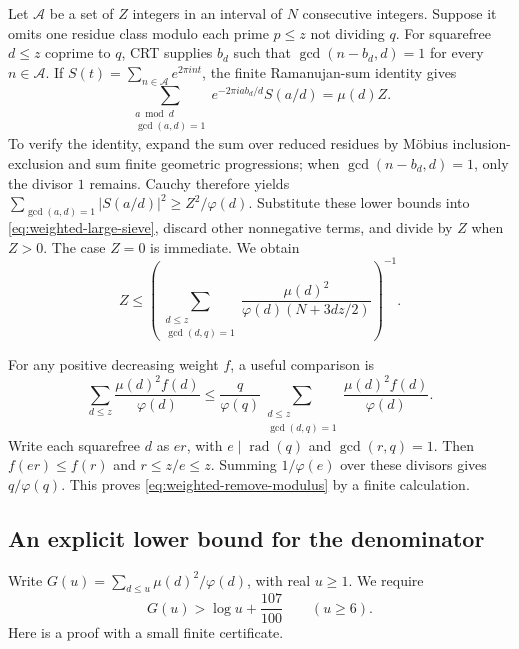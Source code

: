Let $\mathcal A$ be a set of $Z$ integers in an interval of $N$
consecutive integers.  Suppose it omits one residue class modulo
each prime $p\leq z$ not dividing $q$.  For squarefree
$d\leq z$ coprime to $q$, CRT supplies $b_d$ such that
$\gcd(n-b_d,d)=1$ for every $n\in\mathcal A$.  If
$S(t)=\sum_{n\in\mathcal A}e^{2\pi int}$, the finite Ramanujan-sum
identity gives
\[
 \sum_{\substack{a\bmod d\\\gcd(a,d)=1}}
      e^{-2\pi iab_d/d}S(a/d)=\mu(d)Z.
\]
To verify the identity, expand the sum over reduced residues by
M\"obius inclusion-exclusion and sum finite geometric progressions;
when $\gcd(n-b_d,d)=1$, only the divisor $1$ remains.
Cauchy therefore yields
$\sum_{\gcd(a,d)=1}|S(a/d)|^2\geq Z^2/\varphi(d)$.
Substitute these lower bounds into \eqref{eq:weighted-large-sieve},
discard other nonnegative terms, and divide by $Z$ when $Z>0$.
The case $Z=0$ is immediate.  We obtain
\begin{equation}
 Z\leq
 \left(\sum_{\substack{d\leq z\\\gcd(d,q)=1}}
       \frac{\mu(d)^2}{\varphi(d)(N+3dz/2)}\right)^{-1}.
 \label{eq:weighted-arithmetic-sieve}
\end{equation}

For any positive decreasing weight $f$, a useful comparison is
\begin{equation}
 \sum_{d\leq z}\frac{\mu(d)^2f(d)}{\varphi(d)}
 \leq\frac q{\varphi(q)}
       \sum_{\substack{d\leq z\\\gcd(d,q)=1}}
                  \frac{\mu(d)^2f(d)}{\varphi(d)}.
 \label{eq:weighted-remove-modulus}
\end{equation}
Write each squarefree $d$ as $er$, with $e\mid\operatorname{rad}(q)$
and $\gcd(r,q)=1$.  Then $f(er)\leq f(r)$ and $r\leq z/e\leq z$.
Summing $1/\varphi(e)$ over these divisors gives $q/\varphi(q)$.
This proves \eqref{eq:weighted-remove-modulus} by a finite calculation.

\subsection{An explicit lower bound for the denominator}

Write $G(u)=\sum_{d\leq u}\mu(d)^2/\varphi(d)$, with real $u\geq1$.
We require
\begin{equation}
 G(u)>\log u+\frac{107}{100}\qquad(u\geq6).
 \label{eq:strong-G-bound}
\end{equation}
Here is a proof with a small finite certificate.

